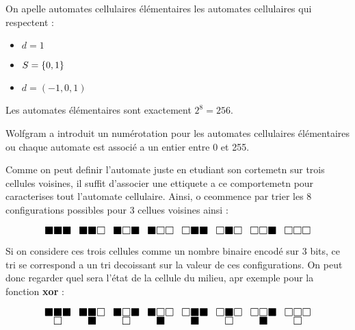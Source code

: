 \begin{definition}

	On apelle automates cellulaires élémentaires les automates cellulaires qui respectent :
	\begin{itemize}
		\item $d = 1$
		\item $S = \left\{0,1\right\}$
		\item $d = (-1,0,1)$
	\end{itemize}

	Les automates élémentaires sont exactement $2^8 = 256$.
\end{definition}

\begin{notation}
	Wolfgram a introduit un numérotation \cite{wolfgramClass} pour les automates cellulaires élémentaires ou chaque automate
	est associé a un entier entre 0 et 255.

	Comme on peut definir l'automate juste en etudiant son cortemetn sur trois cellules voisines, il suffit d'associer une
	ettiquete a ce comportemetn pour caracterises tout l'automate cellulaire. Ainsi, o ceommence par trier
	les 8 configurations possibles pour 3 cellues voisines ainsi :

	\[ \LARGE
		\substack{\blacksquare \blacksquare \blacksquare } \enspace
		\substack{\blacksquare \blacksquare \square } \enspace
		\substack{\blacksquare \square \blacksquare } \enspace
		\substack{\blacksquare \square \square } \enspace
		\substack{\square \blacksquare \blacksquare } \enspace
		\substack{\square \blacksquare \square } \enspace
		\substack{\square \square \blacksquare } \enspace
		\substack{\square \square \square }
	\]

	Si on considere ces trois cellules comme un nombre binaire encodé sur 3 bits, ce tri se correspond a un tri decoissant sur la
	valeur de ces configurations. On peut donc regarder quel sera l'état de la cellule du milieu, apr exemple pour la
	fonction \textbf{xor} :


	\[ \LARGE
		\substack{\blacksquare \blacksquare \blacksquare \\ \square } \enspace
		\substack{\blacksquare \blacksquare \square \\ \blacksquare} \enspace
		\substack{\blacksquare \square \blacksquare \\ \square} \enspace
		\substack{\blacksquare \square \square \\ \blacksquare} \enspace
		\substack{\square \blacksquare \blacksquare \\ \blacksquare} \enspace
		\substack{\square \blacksquare \square \\ \square} \enspace
		\substack{\square \square \blacksquare \\ \blacksquare} \enspace
		\substack{\square \square \square \\ \square}
	\]


\end{notation}
